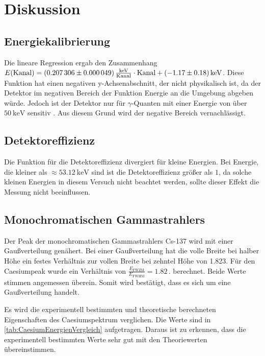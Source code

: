 \section{Diskussion}
\label{sec:Diskussion}


\subsection{Energiekalibrierung}

Die lineare Regression ergab den Zusammenhang $E(\text{Kanal}) = \SI{0.207306 \pm 0.000049}{\frac{\kilo\eV}{\text{Kanal}}} \cdot \text{Kanal} + \SI{-1.17 \pm 0.18}{\kilo\eV}$.
Diese Funktion hat einen negativen y-Achsenabschnitt, der nicht physikalisch ist, da der Detektor im negativen Bereich der Funktion Energie an die Umgebung abgeben würde.
Jedoch ist der Detektor nur für $\gamma$-Quanten mit einer Energie von über $\SI{50}{\kilo\eV}$ sensitiv \cite{v18}.
Aus diesem Grund wird der negative Bereich vernachlässigt.


\subsection{Detektoreffizienz}

Die Funktion für die Detektoreffizienz divergiert für kleine Energien.
Bei Energie, die kleiner als $\approx \SI{53.12}{\kilo\eV}$ sind ist die Detektoreffizienz größer als $1$, 
da solche kleinen Energien in diesem Versuch nicht beachtet werden, sollte dieser Effekt die Messung nicht beeinflussen.


\subsection{Monochromatischen Gammastrahlers}

Der Peak der monochromatischen Gammastrahlers Cs-137 wird mit einer Gaußverteilung genähert.
Bei einer Gaußverteilung hat die volle Breite bei halber Höhe ein festes Verhältnis zur vollen Breite bei zehntel Höhe von 1.823.
Für den Caesiumpeak wurde ein Verhältnis von $\frac{E_{\text{FWZM}}}{E_{\text{FWHM}}} = 1.82\,.$ berechnet.
Beide Werte stimmen angemessen überein. Somit wird bestätigt, dass es sich um eine Gaußverteilung handelt.


Es wird die experimentell bestimmten und theoretische berechneten Eigenschaften des Caesiumspektrum verglichen.
Die Werte sind in \autoref{tab:CaesiumEnergienVergleich} aufgetragen. Daraus ist zu erkennen, dass die experimentell bestimmten Werte sehr gut mit den Theoriewerten übereinstimmen.


